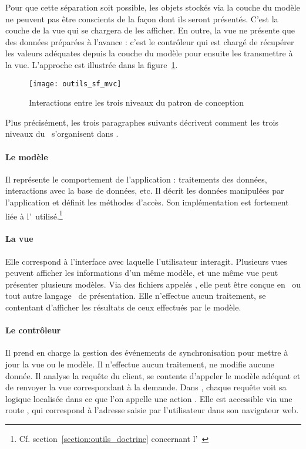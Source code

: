 Pour que cette séparation soit possible, les objets stockés via la couche du modèle ne peuvent pas être conscients de la façon dont ils seront présentés. C'est la couche de la vue qui se chargera de les afficher. En outre, la vue ne présente que des données préparées à l'avance : c'est le contrôleur qui est chargé de récupérer les valeurs adéquates depuis la couche du modèle pour ensuite les transmettre à la vue. L'approche est illustrée dans la figure~\ref{figure:outils_sf_mvc}.

\begin{figure}
	\centering
	\texttt{[image: outils\_sf\_mvc]}
	\caption{Interactions entre les trois niveaux du patron de conception \amvc}
	\label{figure:outils_sf_mvc}
\end{figure}

Plus précisément, les trois paragraphes suivants décrivent comment les trois niveaux du \amvc\ s'organisent dans \asf.

\paragraph{Le modèle}

Il représente le comportement de l'application : traitements des données, interactions avec la base de données, etc. Il décrit les données manipulées par l'application et définit les méthodes d'accès. Son implémentation est fortement liée à l'\aorm\ utilisé.\footnote{Cf. section~\ref{section:outils_doctrine} concernant l'\aorm\ \adoctrine}

\paragraph{La vue}

Elle correspond à l'interface avec laquelle l'utilisateur interagit. Plusieurs vues peuvent afficher les informations d'un même modèle, et une même vue peut présenter plusieurs modèles. Via des fichiers appelés \atemplates, elle peut être conçue en \ahtml\ ou tout autre \og langage \fg\ de pré\-sen\-ta\-ti\-on. Elle n'effectue aucun traitement, se contentant d'afficher les résultats de ceux effectués par le modèle.

\paragraph{Le contrôleur}

Il prend en charge la gestion des événements de synchronisation pour mettre à jour la vue ou le modèle. Il n'effectue aucun traitement, ne modifie aucune donnée. Il analyse la requête du client, se contente d'appeler le modèle adéquat et de renvoyer la vue correspondant à la demande. Dans \asf, chaque requête voit sa logique localisée dans ce que l'on appelle une \og action \fg. Elle est accessible via une \og route \fg, qui correspond à l'adresse saisie par l'utilisateur dans son navigateur web.



